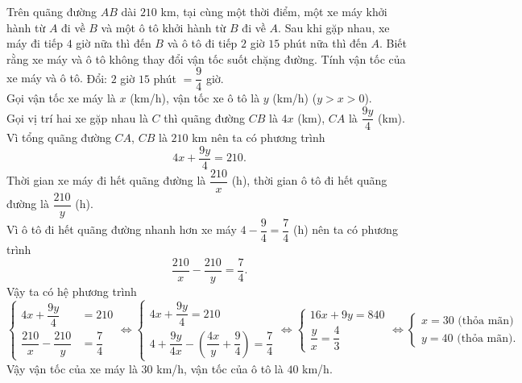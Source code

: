 \begin{ex}%
    Trên quãng đường $AB$ dài $210$ km, tại cùng một thời điểm, một xe máy khởi hành từ $A$ đi về $B$ và một ô tô khởi hành từ $B$ đi về $A$. Sau khi gặp nhau, xe máy đi tiếp $4$ giờ nữa thì đến $B$ và ô tô đi tiếp $2$ giờ $15$ phút nữa thì đến $A$. Biết rằng xe máy và ô tô không thay đổi vận tốc suốt chặng đường. Tính vận tốc của xe máy và ô tô.
	\loigiai
    {
    Đổi: $2$ giờ $15$ phút $=\dfrac{9}{4}$ giờ.\\
    Gọi vận tốc xe máy là $x$ (km/h), vận tốc xe ô tô là $y$ (km/h) ($y>x>0$).\\
    Gọi vị trí hai xe gặp nhau là $C$ thì quãng đường $CB$ là $4x$ (km), $CA$ là $\dfrac{9y}{4}$ (km).\\
    Vì tổng quãng đường $CA$, $CB$ là $210$ km nên ta có phương trình $$4x+\dfrac{9y}{4}=210.$$
    Thời gian xe máy đi hết quãng đường là $\dfrac{210}{x}$ (h), thời gian ô tô đi hết quãng đường là $\dfrac{210}{y}$ (h).\\
    Vì ô tô đi hết quãng đường nhanh hơn xe máy $4-\dfrac{9}{4}=\dfrac{7}{4}$ (h) nên ta có phương trình
    $$\dfrac{210}{x}-\dfrac{210}{y}=\dfrac{7}{4}.$$
    Vậy ta có hệ phương trình\\
    $\begin{cases}
    	4x+\dfrac{9y}{4}&=210\\
    	\dfrac{210}{x}-\dfrac{210}{y}&=\dfrac{7}{4}
    \end{cases}\Leftrightarrow \begin{cases}
    4x+\dfrac{9y}{4}=210\\
    4+\dfrac{9y}{4x}-\left( \dfrac{4x}{y}+\dfrac{9}{4}\right) =\dfrac{7}{4}
    \end{cases}\Leftrightarrow \begin{cases}
    16x+9y=840\\
    \dfrac{y}{x}=\dfrac{4}{3}
    \end{cases}\Leftrightarrow \begin{cases}
    x=30\text{ (thỏa mãn)}\\ y=40\text{ (thỏa mãn)}.
    \end{cases}$\\
    Vậy vận tốc của xe máy là $30$ km/h, vận tốc của ô tô là $40$ km/h.
    }
\end{ex}

